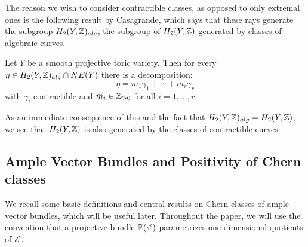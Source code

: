 
The reason we wish to consider contractible classes, as opposed to only extremal ones is the following result by Casagrande, which says that these rays generate the subgroup $H_2(Y,\mathbb{Z})_{alg}$, the subgroup of $H_2(Y,\mathbb{Z})$ generated by classes of algebraic curves.
\begin{theorem}
  \label{thm:CasagrandeSpan}
  Let $Y$ be a smooth projective toric variety. Then for every $\eta \in H_2(Y,\mathbb{Z})_{alg} \cap NE(Y)$ there is a decomposition:
\[ \eta = m_1 \gamma_1 + \cdots + m_r\gamma_r \]
with $\gamma_i$ contractible and $m_i \in \mathbb{Z}_{>0}$ for all $i=1,\dots,r$.
\end{theorem}
As an immediate consequence of this and the fact that $H_2(Y,\mathbb{Z})_{alg} = H_2(Y,\mathbb{Z})$, we see that $H_2(Y,\mathbb{Z})$ is also generated by the classes of contractible curves.

\subsection{Ample Vector Bundles and Positivity of Chern classes}
We recall some basic definitions and central results on Chern classes of ample vector bundles, which will be useful later. Throughout the paper, we will use the convention that a projective bundle $\mathbb{P}(\mathscr{E})$ parametrizes one-dimensional quotients of $\mathscr{E}$.



